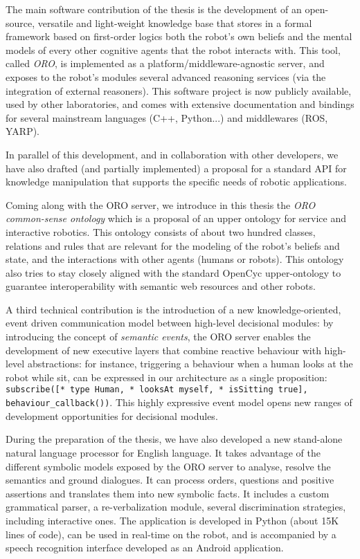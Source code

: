 The main software contribution of the thesis is the development of an
open-source, versatile and light-weight knowledge base that stores in a
formal framework based on first-order logics both the robot's own beliefs and
the mental models of every other cognitive agents that the robot interacts
with. This tool, called \emph{ORO}, is implemented as a
platform/middleware-agnostic server, and exposes to the robot's modules
several advanced reasoning services (via the integration of external
reasoners). This software project is now publicly available, used by other
laboratories, and comes with extensive documentation and bindings for several
mainstream languages (C++, Python...) and middlewares (ROS, YARP).

In parallel of this development, and in collaboration with other developers,
we have also drafted (and partially implemented) a proposal for a standard API
for knowledge manipulation that supports the specific needs of robotic
applications.

Coming along with the ORO server, we introduce in this thesis the
\emph{ORO common-sense ontology} which is a proposal of an upper ontology for
service and interactive robotics. This ontology consists of about two hundred
classes, relations and rules that are relevant for the modeling of the
robot's beliefs and state, and the interactions with other agents (humans or
robots). This ontology also tries to stay closely aligned with the standard
{\sc OpenCyc} upper-ontology to guarantee interoperability with semantic
web resources and other robots.

A third technical contribution is the introduction of a new
knowledge-oriented, event driven communication model between high-level
decisional modules: by introducing the concept of \emph{semantic events}, the ORO
server enables the development of new executive layers that combine reactive
behaviour with high-level abstractions: for instance, triggering a behaviour
when a human looks at the robot while sit, can be expressed in our architecture
as a single proposition: {\tt subscribe([* type Human, * looksAt myself, *
isSitting true], behaviour\_callback())}. This highly expressive event model
opens new ranges of development opportunities for decisional modules.

During the preparation of the thesis, we have also developed a new stand-alone
natural language processor for English language. It takes advantage of the
different symbolic models exposed by the ORO server to analyse, resolve the
semantics and ground dialogues. It can process orders, questions and positive
assertions and translates them into new symbolic facts. It includes a custom
grammatical parser, a re-verbalization module, several discrimination
strategies, including interactive ones. The application is developed in Python
(about 15K lines of code), can be used in real-time on the robot, and is
accompanied by a speech recognition interface developed as an Android
application.

